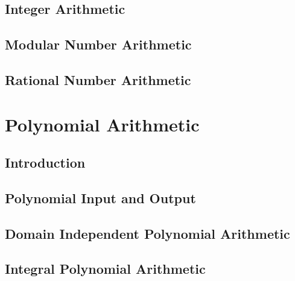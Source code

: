 

\section{Integer Arithmetic}
\label{c:A s:IA}



\section{Modular Number Arithmetic}
\label{c:A s:MA}



\section{Rational Number Arithmetic}
\label{c:A s:RA}




\chapter{Polynomial Arithmetic}
\label{c:PA}

\section{Introduction}
\label{c:PA s:I}



\section{Polynomial Input and Output}
\label{cPAsPIO.tex}



\section{Domain Independent Polynomial Arithmetic}
\label{c:PA s:DIPA}



\section{Integral Polynomial Arithmetic}
\label{c:PA s:IPA}

